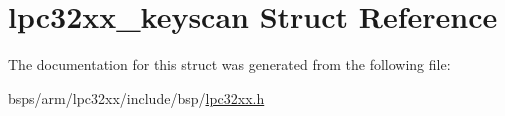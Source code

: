 \hypertarget{structlpc32xx__keyscan}{}\section{lpc32xx\+\_\+keyscan Struct Reference}
\label{structlpc32xx__keyscan}


The documentation for this struct was generated from the following file\+:\begin{DoxyCompactItemize}
\item 
bsps/arm/lpc32xx/include/bsp/\mbox{\hyperlink{lpc32xx_8h}{lpc32xx.\+h}}\end{DoxyCompactItemize}
